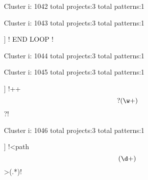 Cluster i: 1042
total projects:3
total patterns:1
\begin{multicols}{1}
\begin{description}[noitemsep,topsep=0pt]
\item [[3] ] \cverb!(\/+[a-z]*\/[a-z]*$)!
\end{description}
\end{multicols}







Cluster i: 1043
total projects:3
total patterns:1
\begin{multicols}{1}
\begin{description}[noitemsep,topsep=0pt]
\item [[3] ] \cverb!\/\* END LOOP \*\/!
\end{description}
\end{multicols}







Cluster i: 1044
total projects:3
total patterns:1
\begin{multicols}{1}
\end{multicols}







Cluster i: 1045
total projects:3
total patterns:1
\begin{multicols}{1}
\begin{description}[noitemsep,topsep=0pt]
\item [[3] ] \cverb!\w+\s+\[?(\w+)\]?!
\end{description}
\end{multicols}







Cluster i: 1046
total projects:3
total patterns:1
\begin{multicols}{1}
\begin{description}[noitemsep,topsep=0pt]
\item [[3] ] \cverb!<path\[(\d+)\]>(.*)!
\end{description}
\end{multicols}







